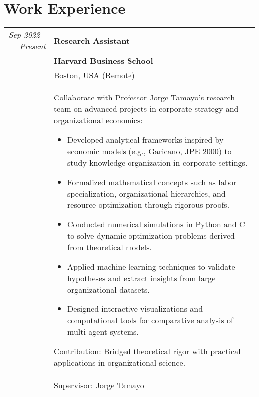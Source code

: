 \documentclass[a4paper,10pt]{article} %
\begin{document}
\vspace{1em}
\section{Work Experience}
\begin{tabular}{r|p{11cm}}
\emph{Sep 2022 - Present} & \textbf{Research Assistant} \\
& \textbf{Harvard Business School} \\
& Boston, USA (Remote) \\
& \footnotesize{
Collaborate with Professor Jorge Tamayo's research team on advanced projects in corporate strategy and organizational economics:
\begin{itemize}
    \item Developed analytical frameworks inspired by economic models (e.g., Garicano, JPE 2000) to study knowledge organization in corporate settings.
    \item Formalized mathematical concepts such as labor specialization, organizational hierarchies, and resource optimization through rigorous proofs.
    \item Conducted numerical simulations in Python and C to solve dynamic optimization problems derived from theoretical models.
    \item Applied machine learning techniques to validate hypotheses and extract insights from large organizational datasets.
    \item Designed interactive visualizations and computational tools for comparative analysis of multi-agent systems.
\end{itemize}
Contribution: Bridged theoretical rigor with practical applications in organizational science.
} \\
& Supervisor: \href{mailto:jtamayo@hbs.edu}{Jorge Tamayo} \\


\end{tabular}
\end{document}
